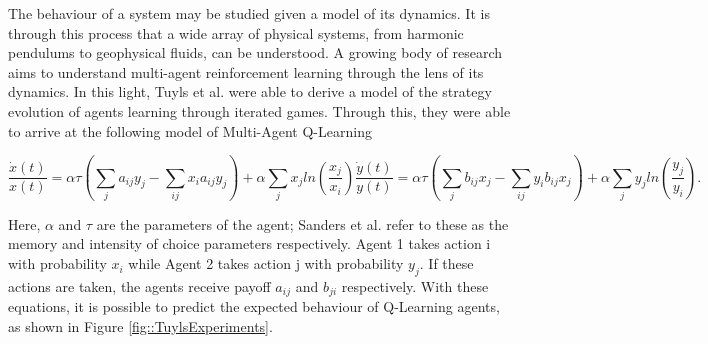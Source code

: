 \documentclass[.../main.tex]{subfiles}
\begin{document}
    The behaviour of a system may be studied given a model of its dynamics. It is through this
    process that a wide array of physical systems, from harmonic pendulums to geophysical fluids,
    can be understood. A growing body of research aims to understand multi-agent reinforcement
    learning through the lens of its dynamics. In this light, Tuyls et al. \cite{Tuyls2006AnGames}
    were able to derive a model of the strategy evolution of agents learning through iterated games.
    Through this, they were able to arrive at the following model of Multi-Agent Q-Learning

	\begin{subequations}
	\label{eqn::EOM}
		\begin{equation}
			\frac{\dot{x}(t)}{x(t)} = \alpha \tau (\sum_{j} a_{ij} y_j - \sum_{i j} x_i a_{ij} y_j)
			+ \alpha \sum_j x_j ln(\frac{x_j}{x_i}) 
		\end{equation}
		\begin{equation}
			\frac{\dot{y}(t)}{y(t)} = \alpha \tau (\sum_{j} b_{ij} x_j - \sum_{i j} y_i b_{ij} x_j)
			+ \alpha \sum_j y_j ln(\frac{y_j}{y_i}).
		\end{equation}
	\end{subequations}

	Here, $\alpha$ and $\tau$ are the parameters of the agent; Sanders et al. refer to these as the
	memory and intensity of choice parameters respectively. Agent 1 takes action i with probability
	$x_i$ while Agent 2 takes action j with probability $y_j$. If these actions are taken, the agents
	receive payoff $a_{ij}$ and $b_{ji}$ respectively. With these equations, it is possible to
	predict the expected behaviour of Q-Learning agents, as shown in Figure 
	\ref{fig::TuylsExperiments}.
\end{document}
